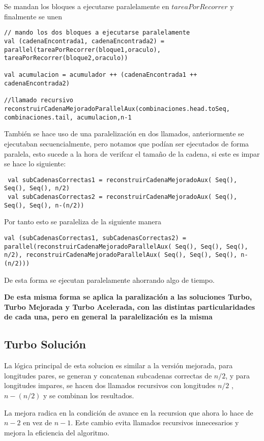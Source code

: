 \documentclass[conference]{IEEEtran}
\begin{document}
Se mandan los bloques a ejecutarse paralelamente en $tareaPorRecorrer$ y finalmente se unen 
\begin{lstlisting}
// mando los dos bloques a ejecutarse paralelamente
val (cadenaEncontrada1, cadenaEncontrada2) = parallel(tareaPorRecorrer(bloque1,oraculo), tareaPorRecorrer(bloque2,oraculo))

val acumulacion = acumulador ++ (cadenaEncontrada1 ++ cadenaEncontrada2)

//llamado recursivo
reconstruirCadenaMejoradoParallelAux(combinaciones.head.toSeq, combinaciones.tail, acumulacion,n-1

\end{lstlisting}

También se hace uso de una paralelización en dos llamados, anteriormente se ejecutaban secuencialmente, pero notamos que podían ser ejecutados de forma paralela, esto sucede a la hora de verifcar el tamaño de la cadena, si este es impar se hace lo siguiente:
\begin{lstlisting}
 val subCadenasCorrectas1 = reconstruirCadenaMejoradoAux( Seq(), Seq(), Seq(), n/2) 
 val subCadenasCorrectas2 = reconstruirCadenaMejoradoAux( Seq(), Seq(), Seq(), n-(n/2))
\end{lstlisting}
Por tanto esto se paraleliza de la siguiente manera
\begin{lstlisting}
val (subCadenasCorrectas1, subCadenasCorrectas2) = parallel(reconstruirCadenaMejoradoParallelAux( Seq(), Seq(), Seq(), n/2), reconstruirCadenaMejoradoParallelAux( Seq(), Seq(), Seq(), n-(n/2)))
\end{lstlisting}

De esta forma se ejecutan paralelamente ahorrando algo de tiempo.

\textbf{De esta misma forma se aplica la paralización a las soluciones Turbo, Turbo Mejorada y Turbo Acelerada, con las distintas particularidades de cada una, pero en general la paralelización es la misma}

\subsection{\textbf{Turbo Solución}}
La lógica principal de esta solucion es similar a la versión mejorada, para longitudes pares, se generan y concatenan subcadenas correctas de $n/2$, y para longitudes impares, se hacen dos llamados recursivos con longitudes $n/2$ , $n-(n/2)$ y se combinan los resultados.

La mejora radica en la condición de avance en la recursion que ahora lo hace de $n-2$ en vez de $n-1$. Este cambio evita llamados recursivos innecesarios y mejora la eficiencia del algoritmo.
\end{document}
